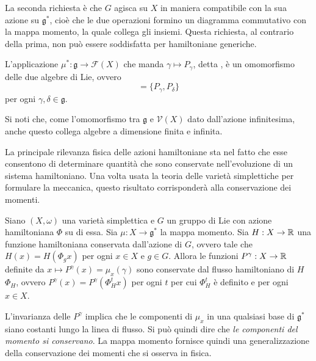 \begin{remark}
  La seconda richiesta è che $G$ agisca su $X$ in maniera compatibile con la sua azione su $\mathfrak{g}^*$, cioè che le due operazioni formino un diagramma commutativo con la mappa momento, la quale collega gli insiemi. Questa richiesta, al contrario della prima, non può essere soddisfatta per hamiltoniane generiche.
\end{remark}
\begin{remark}
  L'applicazione $\mu^*:\mathfrak{g} \to \mathcal{F}(X)$ che manda $\gamma \mapsto P_{\gamma}$, detta , è un omomorfismo delle due algebre di Lie, ovvero 
  \begin{equation*}
  [\gamma,\delta] = \{P_{\gamma}, P_{\delta}\} 
  \end{equation*} 
  per ogni $\gamma,\delta \in \mathfrak{g}$.
\end{remark}
\begin{remark}
  Si noti che, come l'omomorfismo tra $\mathfrak{g}$ e $\mathcal{V}(X)$ dato dall'azione infinitesima, anche questo collega algebre a dimensione finita e infinita.
\end{remark}

La principale rilevanza fisica delle azioni hamiltoniane sta nel fatto che esse consentono di determinare quantità che sono conservate nell'evoluzione di un sistema hamiltoniano. Una volta usata la teoria delle varietà simplettiche per formulare la meccanica, questo risultato corrisponderà alla conservazione dei momenti.
\begin{theorem}
  Siano $(X,\omega)$ una varietà simplettica e $G$ un gruppo di Lie con azione hamiltoniana $\Phi$ su di essa. Sia $\mu: X\to \mathfrak{g}^*$ la mappa momento. Sia $H: X\to \mathbb{R}$ una funzione hamiltoniana conservata dall'azione di $G$, ovvero tale che $H(x) = H(\Phi_g x)$ per ogni $x \in X$ e $g \in G$. Allora le funzioni $P^{\gamma}: X\to \mathbb{R}$ definite da $x \mapsto P^{\gamma}(x) = \mu_x(\gamma)$ sono conservate dal flusso hamiltoniano di $H$ $\Phi_H$, ovvero $P^{\gamma}(x) = P^{\gamma}(\Phi^t_H x)$ per ogni $t$ per cui $\Phi^t_H$ è definito e per ogni $x \in X$.
\end{theorem}
\begin{remark}
  L'invarianza delle $P^{\gamma}$ implica che le componenti di $\mu_x$ in una qualsiasi base di $\mathfrak{g}^*$ siano costanti lungo la linea di flusso. Si può quindi dire che \emph{le componenti del momento si conservano}. La mappa momento fornisce quindi una generalizzazione della conservazione dei momenti che si osserva in fisica.
\end{remark}

